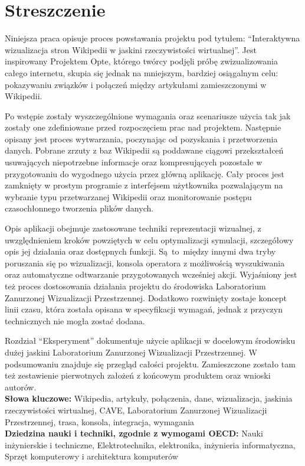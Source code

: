 \chapter*{Streszczenie}
Niniejsza praca opisuje proces powstawania projektu pod tytułem: ``Interaktywna wizualizacja stron Wikipedii w jaskini rzeczywistości wirtualnej''. Jest inspirowany Projektem Opte, którego twórcy podjęli próbę zwizualizowania całego internetu, skupia się jednak na mniejszym, bardziej osiągalnym celu: pokazywaniu związków i połączeń między artykułami zamieszczonymi w Wikipedii. 

Po wstępie zostały wyszczególnione wymagania oraz scenariusze użycia tak jak zostały one zdefiniowane przed rozpoczęciem prac nad projektem. Następnie opisany jest proces wytwarzania, poczynając od pozyskania i przetworzenia danych. Pobrane zrzuty z baz Wikipedii są poddawane ciągowi przekształceń usuwających niepotrzebne informacje oraz kompresujących pozostałe w przygotowaniu do wygodnego użycia przez główną aplikację. Cały proces jest zamknięty w prostym programie z interfejsem użytkownika pozwalającym na wybranie typu przetwarzanej Wikipedii oraz monitorowanie postępu czasochłonnego tworzenia plików danych.

Opis aplikacji obejmuje zastosowane techniki reprezentacji wizualnej, z uwzględnieniem kroków powziętych w celu optymalizacji symulacji, szczegółowy opis jej działania oraz dostępnych funkcji. Są~to~między innymi dwa tryby poruszania się po wizualizacji, konsola operatora z możliwością wyszukiwania oraz automatyczne odtwarzanie przygotowanych wcześniej akcji. Wyjaśniony jest też proces dostosowania działania projektu do środowiska Laboratorium Zanurzonej Wizualizacji Przestrzennej. Dodatkowo rozwinięty zostaje koncept linii czasu, która została opisana w specyfikacji wymagań, jednak z przyczyn technicznych nie mogła zostać dodana.

Rozdział ``Eksperyment'' dokumentuje użycie aplikacji w docelowym środowisku dużej jaskini Laboratorium Zanurzonej Wizualizacji Przestrzennej. W podsumowaniu znajduje się przegląd całości projektu. Zamieszczone zostało tam też zestawienie pierwotnych założeń z końcowym produktem oraz wnioski autorów.\\

\noindent\textbf{Słowa kluczowe:} Wikipedia, artykuły, połączenia, dane, wizualizacja, jaskinia rzeczywistości wirtualnej, CAVE, Laboratorium Zanurzonej Wizualizacji Przestrzennej, trasa, konsola, integracja, wymagania \\

\noindent\textbf{Dziedzina nauki i techniki, zgodnie z wymogami OECD:} Nauki inżynierskie i techniczne, Elektrotechnika, elektronika, inżynieria informatyczna, Sprzęt komputerowy i architektura komputerów
